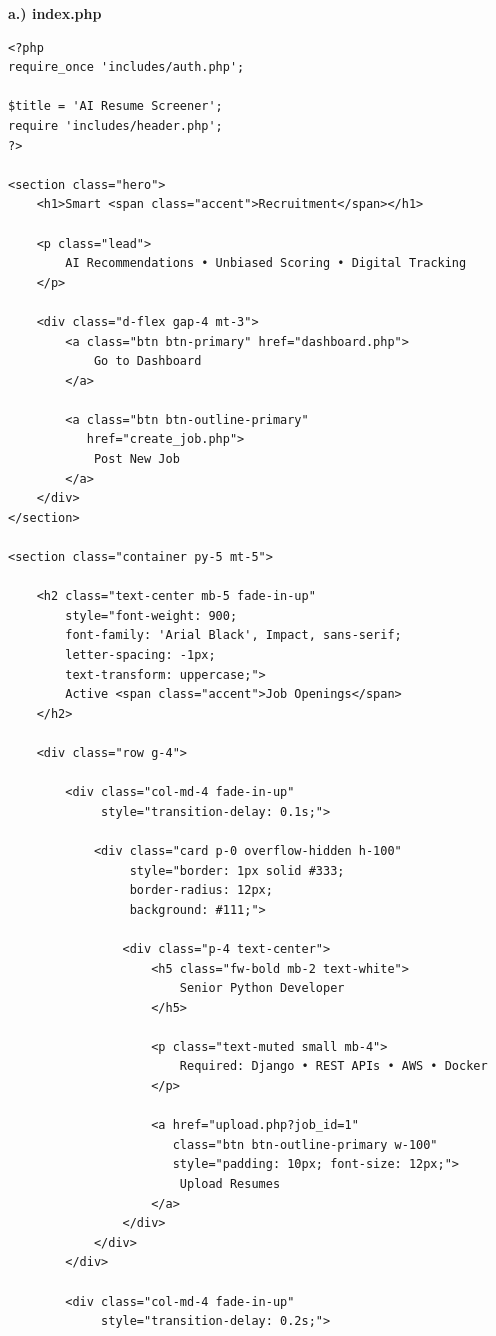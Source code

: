 \documentclass[12pt,a4paper]{report}
\begin{document}
\textbf{a.) index.php}

\noindent
\small
\begin{verbatim}
<?php
require_once 'includes/auth.php';

$title = 'AI Resume Screener';
require 'includes/header.php';
?>

<section class="hero">
    <h1>Smart <span class="accent">Recruitment</span></h1>

    <p class="lead">
        AI Recommendations • Unbiased Scoring • Digital Tracking
    </p>

    <div class="d-flex gap-4 mt-3">
        <a class="btn btn-primary" href="dashboard.php">
            Go to Dashboard
        </a>

        <a class="btn btn-outline-primary"
           href="create_job.php">
            Post New Job
        </a>
    </div>
</section>

<section class="container py-5 mt-5">

    <h2 class="text-center mb-5 fade-in-up"
        style="font-weight: 900;
        font-family: 'Arial Black', Impact, sans-serif;
        letter-spacing: -1px;
        text-transform: uppercase;">
        Active <span class="accent">Job Openings</span>
    </h2>

    <div class="row g-4">

        <div class="col-md-4 fade-in-up"
             style="transition-delay: 0.1s;">

            <div class="card p-0 overflow-hidden h-100"
                 style="border: 1px solid #333;
                 border-radius: 12px;
                 background: #111;">

                <div class="p-4 text-center">
                    <h5 class="fw-bold mb-2 text-white">
                        Senior Python Developer
                    </h5>

                    <p class="text-muted small mb-4">
                        Required: Django • REST APIs • AWS • Docker
                    </p>

                    <a href="upload.php?job_id=1"
                       class="btn btn-outline-primary w-100"
                       style="padding: 10px; font-size: 12px;">
                        Upload Resumes
                    </a>
                </div>
            </div>
        </div>

        <div class="col-md-4 fade-in-up"
             style="transition-delay: 0.2s;">


\end{verbatim}
\end{document}
